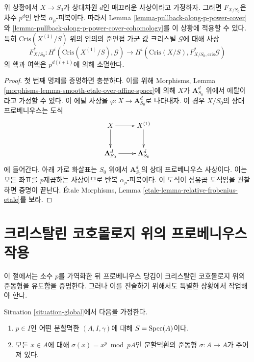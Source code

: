 \begin{lemma}
\label{lemma-pullback-relative-frobenius}
위 상황에서 $X \to S_0$가 상대차원 $d$인 매끄러운 사상이라고
가정하자. 그러면 $F_{X/S_0}$은 차수 $p^d$인 반복
$\alpha_p$-피복이다. 따라서 Lemma
\ref{lemma-pullback-along-p-power-cover}와
\ref{lemma-pullback-along-p-power-cover-cohomology}를 이 상황에
적용할 수 있다. 특히 $\text{Cris}(X^{(1)}/S)$ 위의 임의의 준연접
가군 값 크리스털 $\mathcal{G}$에 대해 사상
$$
F_{X/S_0}^* : H^i(\text{Cris}(X^{(1)}/S), \mathcal{G})
\longrightarrow
H^i(\text{Cris}(X/S), F_{X/S_0, \text{cris}}^*\mathcal{G})
$$
의 핵과 여핵은 $p^{d(i + 1)}$에 의해 소멸한다.
\end{lemma}

\begin{proof}
첫 번째 명제를 증명하면 충분하다. 이를 위해 Morphisms, Lemma
\ref{morphisms-lemma-smooth-etale-over-affine-space}에 의해 $X$가
$\mathbf{A}^d_{S_0}$ 위에서 에탈이라고 가정할 수 있다. 이 에탈
사상을 $\varphi : X \to \mathbf{A}^d_{S_0}$로 나타내자. 이 경우
$X/S_0$의 상대 프로베니우스는 도식
$$
\xymatrix{
X \ar[d] \ar[r] & X^{(1)} \ar[d] \\
\mathbf{A}^d_{S_0} \ar[r] & \mathbf{A}^d_{S_0}
}
$$
에 들어간다. 아래 가로 화살표는 $S_0$ 위에서
$\mathbf{A}^d_{S_0}$의 상대 프로베니우스 사상이다. 이는 모든 좌표를
$p$제곱하는 사상이므로 반복 $\alpha_p$-피복이다. 이 도식이 섬유곱
도식임을 관찰하면 증명이 끝난다. \'Etale Morphisms, Lemma
\ref{etale-lemma-relative-frobenius-etale}를 보라.
\end{proof}













\section{크리스탈린 코호몰로지 위의 프로베니우스 작용}
\label{section-frobenius}

\noindent
이 절에서는 소수 $p$를 가역화한 뒤 프로베니우스 당김이 크리스탈린
코호몰로지 위의 준동형을 유도함을 증명한다. 그러나 이를 진술하기
위해서도 특별한 상황에서 작업해야 한다.

\begin{situation}
\label{situation-F-crystal}
Situation \ref{situation-global}에서 다음을 가정한다.
\begin{enumerate}
\item $p \in I$인 어떤 분할멱환 $(A, I, \gamma)$에 대해
$S = \mathop{\mathrm{Spec}}(A)$이다.
\item 모든 $x \in A$에 대해 $\sigma(x) = x^p \bmod pA$인 분할멱환의
준동형 $\sigma : A \to A$가 주어져 있다.
\end{enumerate}
\end{situation}

